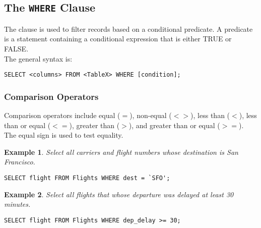 \documentclass{article}
\newtheorem{example}{Example}
\begin{document}
\subsection*{The \texttt{WHERE} Clause}
 
 The \verb@WHERE@ clause is used to filter records based on a conditional predicate.  A predicate is a statement containing a conditional expression that is either TRUE or FALSE. \\ %


\noindent The general syntax is:

\begin{lstlisting}[frame=single]  
SELECT <columns> FROM <TableX> WHERE [condition];
\end{lstlisting} 









\subsubsection*{Comparison Operators}

Comparison operators include equal ($=$), non-equal ($<>$), less than ($<$), less than or equal ($<=$),  greater than ($>$), and greater than or equal ($>=$).  The equal sign is used to test equality.\\

\begin{example}
Select all carriers and flight numbers whose destination is San Francisco.    
\end{example}
\begin{lstlisting}[frame=single]  
SELECT flight FROM Flights WHERE dest = `SFO';
\end{lstlisting} 






\begin{example}
Select all flights that whose departure was delayed at least 30 minutes.
   
\end{example}

\begin{lstlisting}[frame=single]  
SELECT flight FROM Flights WHERE dep_delay >= 30;
\end{lstlisting} 
\end{document}
